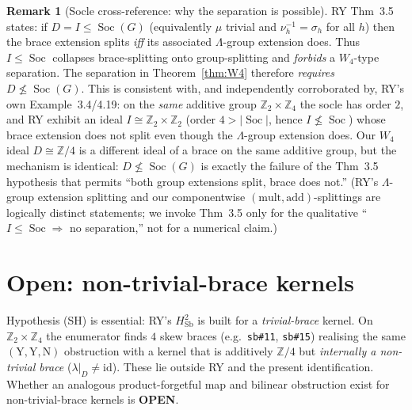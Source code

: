 \documentclass[11pt]{article}
\theoremstyle{definition}
\newtheorem{remark}[theorem]{Remark}
\newcommand{\Sb}{\mathrm{Sb}}
\newcommand{\Z}{\mathbb{Z}}
\newcommand{\Soc}{\operatorname{Soc}}
\newcommand{\id}{\mathrm{id}}
\begin{document}
\begin{remark}[Socle cross-reference: why the separation is possible]\label{rem:socle}
RY Thm~3.5 states: if $D=I\le\Soc(G)$ (equivalently $\mu$ trivial and $\nu_h^{-1}=\sigma_h$
for all $h$) then the brace extension splits \emph{iff} its associated $\Lambda$-group extension
does. Thus $I\le\Soc$ collapses brace-splitting onto group-splitting and \emph{forbids} a
$W_4$-type separation. The separation in Theorem~\ref{thm:W4} therefore \emph{requires}
$D\not\le\Soc(G)$. This is consistent with, and independently corroborated by, RY's own
Example~3.4/4.19: on the \emph{same} additive group $\Z_2\times\Z_4$ the socle has order $2$, and
RY exhibit an ideal $I\cong\Z_2\times\Z_2$ (order $4>|\Soc|$, hence $I\not\le\Soc$) whose brace
extension does not split even though the $\Lambda$-group extension does. Our $W_4$ ideal
$D\cong\Z/4$ is a different ideal of a brace on the same additive group, but the mechanism is
identical: $D\not\le\Soc(G)$ is exactly the failure of the Thm~3.5 hypothesis that permits
``both group extensions split, brace does not.'' (RY's $\Lambda$-group extension splitting and our
componentwise $(\text{mult},\text{add})$-splittings are logically distinct statements; we invoke
Thm~3.5 only for the qualitative ``$I\le\Soc\Rightarrow$ no separation,'' not for a numerical claim.)
\end{remark}

\section{Open: non-trivial-brace kernels}\label{sec:open}

Hypothesis (SH) is essential: RY's $H^2_\Sb$ is built for a \emph{trivial-brace} kernel. On
$\Z_2\times\Z_4$ the enumerator finds $4$ skew braces (e.g.\ \texttt{sb\#11}, \texttt{sb\#15}) realising
the same $(\mathrm{Y},\mathrm{Y},\mathrm{N})$ obstruction with a kernel that is additively $\Z/4$
but \emph{internally a non-trivial brace} ($\lambda|_D\neq\id$). These lie outside RY and the
present identification. Whether an analogous product-forgetful map and bilinear obstruction
exist for non-trivial-brace kernels is \textbf{OPEN}.
\end{document}
